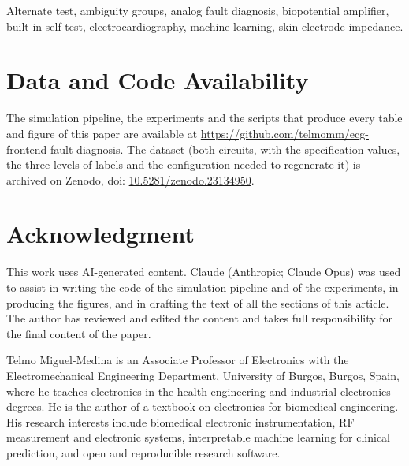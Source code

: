\documentclass[lettersize,journal]{IEEEtran}
\begin{document}
\begin{IEEEkeywords}
Alternate test, ambiguity groups, analog fault diagnosis, biopotential amplifier, built-in
self-test, electrocardiography, machine learning, skin-electrode impedance.
\end{IEEEkeywords}








\section*{Data and Code Availability}
The simulation pipeline, the experiments and the scripts that produce every table and figure of
this paper are available at \url{https://github.com/telmomm/ecg-frontend-fault-diagnosis}. The
dataset (both circuits, with the specification values, the three levels of labels and the
configuration needed to regenerate it) is archived on Zenodo, doi:
\url{10.5281/zenodo.23134950}.

\section*{Acknowledgment}

This work uses AI-generated content. Claude (Anthropic; Claude Opus) was used to assist in
writing the code of the simulation pipeline and of the experiments, in producing the figures,
and in drafting the text of all the sections of this article. The author has reviewed and edited
the content and takes full responsibility for the final content of the paper.




\begin{IEEEbiographynophoto}{Telmo Miguel-Medina}
is an Associate Professor of Electronics with the Electromechanical Engineering Department,
University of Burgos, Burgos, Spain, where he teaches electronics in the health engineering and
industrial electronics degrees. He is the author of a textbook on electronics for biomedical
engineering. His research interests include biomedical electronic instrumentation, RF measurement
and electronic systems, interpretable machine learning for clinical prediction, and open and
reproducible research software.
\end{IEEEbiographynophoto}
\end{document}
